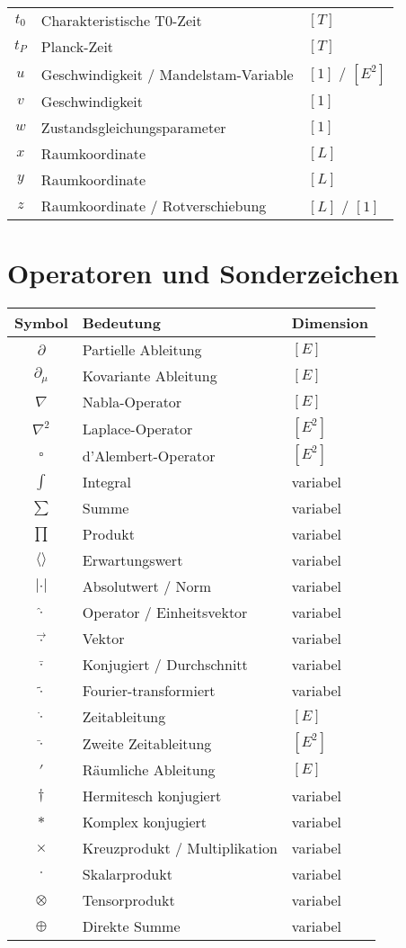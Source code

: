 \documentclass[12pt,a4paper]{report}
\begin{document}
\begin{longtable}{|c|l|l|}
		$t_0$ & Charakteristische T0-Zeit & $[T]$ \\
		$t_P$ & Planck-Zeit & $[T]$ \\
		$u$ & Geschwindigkeit / Mandelstam-Variable & $[1]$ / $[E^2]$ \\
		$v$ & Geschwindigkeit & $[1]$ \\
		$w$ & Zustandsgleichungsparameter & $[1]$ \\
		$x$ & Raumkoordinate & $[L]$ \\
		$y$ & Raumkoordinate & $[L]$ \\
		$z$ & Raumkoordinate / Rotverschiebung & $[L]$ / $[1]$ \\
		\hline
	\end{longtable}
	
	\section{Operatoren und Sonderzeichen}
	\label{sec:operators_special}
	
	\begin{longtable}{|c|l|l|}
		\hline
		\textbf{Symbol} & \textbf{Bedeutung} & \textbf{Dimension} \\
		\hline
		$\partial$ & Partielle Ableitung & $[E]$ \\
		$\partial_\mu$ & Kovariante Ableitung & $[E]$ \\
		$\nabla$ & Nabla-Operator & $[E]$ \\
		$\nabla^2$ & Laplace-Operator & $[E^2]$ \\
		$\square$ & d'Alembert-Operator & $[E^2]$ \\
		$\int$ & Integral & variabel \\
		$\sum$ & Summe & variabel \\
		$\prod$ & Produkt & variabel \\
		$\langle \rangle$ & Erwartungswert & variabel \\
		$|\cdot|$ & Absolutwert / Norm & variabel \\
		$\hat{\cdot}$ & Operator / Einheitsvektor & variabel \\
		$\vec{\cdot}$ & Vektor & variabel \\
		$\bar{\cdot}$ & Konjugiert / Durchschnitt & variabel \\
		$\tilde{\cdot}$ & Fourier-transformiert & variabel \\
		$\dot{\cdot}$ & Zeitableitung & $[E]$ \\
		$\ddot{\cdot}$ & Zweite Zeitableitung & $[E^2]$ \\
		$\prime$ & Räumliche Ableitung & $[E]$ \\
		$\dagger$ & Hermitesch konjugiert & variabel \\
		$*$ & Komplex konjugiert & variabel \\
		$\times$ & Kreuzprodukt / Multiplikation & variabel \\
		$\cdot$ & Skalarprodukt & variabel \\
		$\otimes$ & Tensorprodukt & variabel \\
		$\oplus$ & Direkte Summe & variabel \\
		\hline
	\end{longtable}
	
\end{document}
